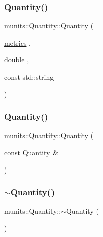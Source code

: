 \subsubsection{\texorpdfstring{Quantity()}{Quantity()}\hspace{0.1cm}{\footnotesize\ttfamily [1/3]}}
{\footnotesize\ttfamily munits\+::\+Quantity\+::\+Quantity (\begin{DoxyParamCaption}\item[{\hyperlink{namespacemunits_a22c8effe19fdc3eb888884aa217f0c25}{metrics}}]{,  }\item[{double}]{,  }\item[{const std\+::string}]{ }\end{DoxyParamCaption})\hspace{0.3cm}{\ttfamily [explicit]}}

\mbox{\label{classmunits_1_1_quantity_aeeb10868a2ec67f430442182b2690869}} 
\subsubsection{\texorpdfstring{Quantity()}{Quantity()}\hspace{0.1cm}{\footnotesize\ttfamily [2/3]}}
{\footnotesize\ttfamily munits\+::\+Quantity\+::\+Quantity (\begin{DoxyParamCaption}\item[{const \hyperlink{classmunits_1_1_quantity}{Quantity} \&}]{ }\end{DoxyParamCaption})\hspace{0.3cm}{\ttfamily [default]}}

\mbox{\label{classmunits_1_1_quantity_a01e795d566b95da5ecbe0f1aa99076d7}} 
\subsubsection{\texorpdfstring{$\sim$\+Quantity()}{~Quantity()}}
{\footnotesize\ttfamily munits\+::\+Quantity\+::$\sim$\+Quantity (\begin{DoxyParamCaption}{ }\end{DoxyParamCaption})\hspace{0.3cm}{\ttfamily [inline]}}


